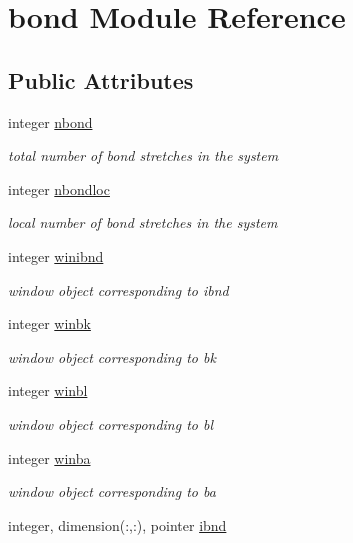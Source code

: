\hypertarget{classbond}{\section{bond Module Reference}
\label{classbond}
}
\subsection*{Public Attributes}
\begin{DoxyCompactItemize}
\item 
integer \hyperlink{classbond_ab84bb10c64483bbfcca2287873670251}{nbond}
\begin{DoxyCompactList}\small\item\em total number of bond stretches in the system \end{DoxyCompactList}\item 
integer \hyperlink{classbond_a0f5ecb5dd524ee50c5ec342848406013}{nbondloc}
\begin{DoxyCompactList}\small\item\em local number of bond stretches in the system \end{DoxyCompactList}\item 
integer \hyperlink{classbond_a3c968c3e9d38bde7c64c25e61cd89d56}{winibnd}
\begin{DoxyCompactList}\small\item\em window object corresponding to ibnd \end{DoxyCompactList}\item 
integer \hyperlink{classbond_ab7e99ca415e49076ed9366c543f23631}{winbk}
\begin{DoxyCompactList}\small\item\em window object corresponding to bk \end{DoxyCompactList}\item 
integer \hyperlink{classbond_a8481829f284ff0a55f6034079489be5e}{winbl}
\begin{DoxyCompactList}\small\item\em window object corresponding to bl \end{DoxyCompactList}\item 
integer \hyperlink{classbond_ad745f5076fde83250c415387f3d01ff8}{winba}
\begin{DoxyCompactList}\small\item\em window object corresponding to ba \end{DoxyCompactList}\item 
integer, dimension(\-:,\-:), pointer \hyperlink{classbond_ad101842428382801adf4b1a978682072}{ibnd}

\end{DoxyCompactItemize}
